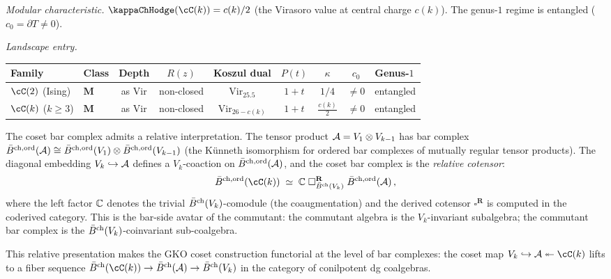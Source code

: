 \begin{computation}
\smallskip
\noindent
\emph{Modular characteristic.}
$\kappaChHodge(\cC(k)) = c(k)/2$
(the Virasoro value at central charge $c(k)$).
The genus-$1$ regime is entangled ($c_0 = \partial T \ne 0$).

\smallskip
\noindent
\emph{Landscape entry.}
\begin{center}
\small
\renewcommand{\arraystretch}{1.4}
\begin{tabular}{llccccccl}
\toprule
\textbf{Family}
 & \textbf{Class}
 & \textbf{Depth}
 & $R(z)$
 & \textbf{Koszul dual}
 & $P(t)$
 & $\kappa$
 & $c_0$
 & \textbf{Genus-$1$} \\
\midrule
$\cC(2)$ (Ising)
 & $\mathbf{M}$
 & as Vir
 & non-closed
 & $\mathrm{Vir}_{25.5}$
 & $1{+}t$
 & $1/4$
 & $\ne 0$
 & entangled \\[3pt]
$\cC(k)$ ($k \ge 3$)
 & $\mathbf{M}$
 & as Vir
 & non-closed
 & $\mathrm{Vir}_{26-c(k)}$
 & $1{+}t$
 & $\frac{c(k)}{2}$
 & $\ne 0$
 & entangled \\
\bottomrule
\end{tabular}
\end{center}
\end{computation}

\begin{remark}%
\label{rem:coset-relative-bar}%
%
%
The coset bar complex admits a relative interpretation.
The tensor product $\mathcal{A} = V_1 \otimes V_{k-1}$ has bar
complex $\bar{B}^{\mathrm{ch,ord}}(\mathcal{A}) \cong
\bar{B}^{\mathrm{ch,ord}}(V_1) \otimes
\bar{B}^{\mathrm{ch,ord}}(V_{k-1})$ (the K\"{u}nneth
isomorphism for ordered bar complexes of mutually
regular tensor products). The diagonal embedding
$V_k \hookrightarrow \mathcal{A}$ defines a $V_k$-coaction
on $\bar{B}^{\mathrm{ch,ord}}(\mathcal{A})$, and the coset bar
complex is the \emph{relative cotensor}:
\begin{equation}\label{eq:coset-relative-cotensor}
\bar{B}^{\mathrm{ch,ord}}(\cC(k))
\;\simeq\;
\C \;\square_{\barBch(V_k)}^{\mathbf{R}}\;
\bar{B}^{\mathrm{ch,ord}}(\cA)\,,
\end{equation}
where the left factor $\mathbb{C}$ denotes the trivial
$\bar{B}^{\mathrm{ch}}(V_k)$-comodule (the coaugmentation) and the
derived cotensor $\square^{\mathbf{R}}$ is computed in
the coderived category. This is the bar-side avatar of
the commutant: the commutant algebra is the
$V_k$-invariant subalgebra; the commutant bar complex is
the $\bar{B}^{\mathrm{ch}}(V_k)$-coinvariant sub-coalgebra.

This relative presentation makes the GKO coset construction
functorial at the level of bar complexes: the coset map
$V_k \hookrightarrow \cA \twoheadleftarrow \cC(k)$ lifts
to a fiber sequence
$\barBch(\cC(k)) \to \barBch(\cA)
\to \barBch(V_k)$
in the category of conilpotent dg coalgebras.
\end{remark}


